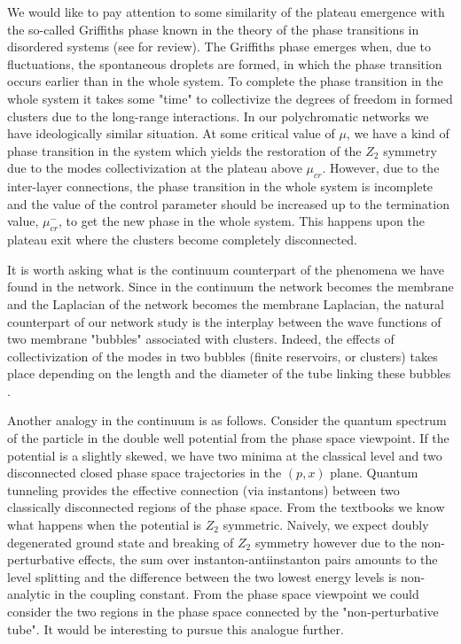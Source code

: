 \documentclass[aps,12pt]{revtex4}
\begin{document}
We would like to pay attention to some similarity of the plateau emergence with the so-called Griffiths phase known in the theory of the phase transitions in disordered systems (see \cite{vojta} for review). The Griffiths phase emerges when, due to fluctuations, the spontaneous droplets are formed, in which the phase transition occurs earlier than in the whole system. To complete the phase transition in the whole system it takes some "time" to collectivize the degrees of freedom in formed clusters due to the long-range interactions. In our polychromatic networks we have ideologically similar situation. At some critical value of $\mu$, we have a kind of phase transition in the system which yields the restoration of the $Z_2$ symmetry due to the modes collectivization at the plateau above $\mu_{cr}$. However, due to the inter-layer connections, the phase transition in the whole system is incomplete and the value of the control parameter should be increased up to the termination value, $\mu^-_{cr}$, to get the new  phase in the whole system. This happens upon the plateau exit where the clusters become completely disconnected.

It is worth asking what is the continuum counterpart of the phenomena we have found in the network. Since in the continuum the network becomes the membrane and the Laplacian of the network becomes the membrane Laplacian, the natural counterpart of our network study is the interplay between the wave functions of two membrane "bubbles" associated with clusters. Indeed, the effects of collectivization of the modes in two bubbles (finite reservoirs, or clusters) takes place depending on the length and the diameter of the tube linking these bubbles \cite{Grebenkov}.

Another analogy in the continuum is as follows. Consider the quantum spectrum of the particle in the double well potential from the phase space viewpoint. If the potential is a slightly skewed, we have two minima at the classical level and two disconnected closed phase space trajectories in the $(p,x)$ plane. Quantum tunneling provides the effective connection (via instantons) between two classically disconnected regions of the phase space. From the textbooks we know what happens when the potential is $Z_2$ symmetric. Naively, we expect doubly degenerated ground state and breaking of $Z_2$ symmetry however due to the non-perturbative effects, the sum over instanton-antiinstanton pairs amounts to the level splitting and the difference between the two lowest energy levels is non-analytic in the coupling constant. From the phase space viewpoint we could consider the two regions in the phase space connected by the "non-perturbative tube". It would be interesting to pursue this analogue further.
\end{document}
